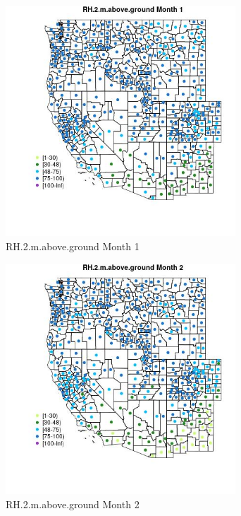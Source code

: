 \begin{figure} 
\centering  
\includegraphics[width=0.77\textwidth]{Code_Outputs/df_report_ML_predictors_CountyCentroid_Locations_Dates_2008-01-01to2018-12-31_MapObsMo1RH2maboveground.jpg} 
\caption{\label{fig:df_report_ML_predictors_CountyCentroid_Locations_Dates_2008-01-01to2018-12-31MapObsMo1RH2maboveground}RH.2.m.above.ground Month 1} 
\end{figure} 
 

\begin{figure} 
\centering  
\includegraphics[width=0.77\textwidth]{Code_Outputs/df_report_ML_predictors_CountyCentroid_Locations_Dates_2008-01-01to2018-12-31_MapObsMo2RH2maboveground.jpg} 
\caption{\label{fig:df_report_ML_predictors_CountyCentroid_Locations_Dates_2008-01-01to2018-12-31MapObsMo2RH2maboveground}RH.2.m.above.ground Month 2} 
\end{figure} 
 

